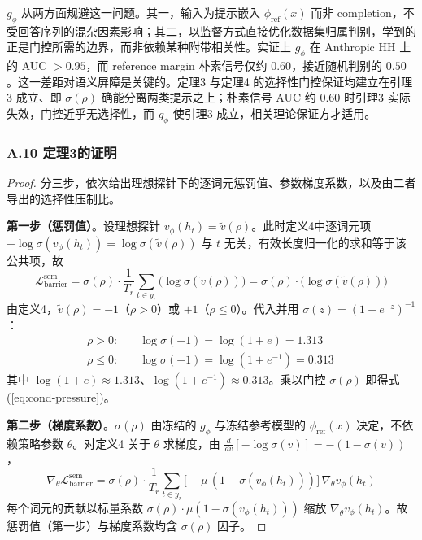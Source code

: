 \documentclass[lettersize,journal]{IEEEtran}
\begin{document}
$g_\phi$ 从两方面规避这一问题。其一，输入为提示嵌入 $\phi_{\text{ref}}(x)$ 而非 completion，不受回答序列的混杂因素影响；其二，以监督方式直接优化数据集归属判别，学到的正是门控所需的边界，而非依赖某种附带相关性。实证上 $g_\phi$ 在 Anthropic HH 上的 AUC $> 0.95$，而 reference margin 朴素信号仅约 $0.60$，接近随机判别的 $0.50$。这一差距对语义屏障是关键的。定理3 与定理4 的选择性门控保证均建立在引理3 成立、即 $\sigma(\rho)$ 确能分离两类提示之上；朴素信号 AUC 约 $0.60$ 时引理3 实际失效，门控近乎无选择性，而 $g_\phi$ 使引理3 成立，相关理论保证方才适用。

\subsubsection*{A.10 定理3的证明}\label{app:condpressure}
\begin{proof}
分三步，依次给出理想探针下的逐词元惩罚值、参数梯度系数，以及由二者导出的选择性压制比。

\textbf{第一步（惩罚值）}。设理想探针 $v_\phi(h_t) = \tilde{v}(\rho)$。此时定义4中逐词元项 $-\log\sigma(v_\phi(h_t)) = \log\sigma(\tilde{v}(\rho))$ 与 $t$ 无关，有效长度归一化的求和等于该公共项，故
\begin{equation}
\mathcal{L}^{\text{sem}}_{\text{barrier}}
= \sigma(\rho)\cdot\frac{1}{T_r}\sum_{t \in y_r}\bigl(\log\sigma(\tilde{v}(\rho))\bigr)
= \sigma(\rho)\cdot\bigl(\log\sigma(\tilde{v}(\rho))\bigr)
\end{equation}
由定义4，$\tilde{v}(\rho) = -1$（$\rho > 0$）或 $+1$（$\rho \leq 0$）。代入并用 $\sigma(z) = (1+e^{-z})^{-1}$：
\begin{align}
\rho > 0:\quad &\log\sigma(-1) = \log(1 + e) = 1.313\, \\
\rho \leq 0:\quad &\log\sigma(+1) = \log(1 + e^{-1}) = 0.313\,
\end{align}
其中 $\log(1+e) \approx 1.313$、$\log(1+e^{-1}) \approx 0.313$。乘以门控 $\sigma(\rho)$ 即得式(\ref{eq:cond-pressure})。

\textbf{第二步（梯度系数）}。$\sigma(\rho)$ 由冻结的 $g_\phi$ 与冻结参考模型的 $\phi_{\text{ref}}(x)$ 决定，不依赖策略参数 $\theta$。对定义4 关于 $\theta$ 求梯度，由 $\frac{d}{dv}[-\log\sigma(v)] = -(1-\sigma(v))$，
\begin{equation}
\nabla_\theta\mathcal{L}^{\text{sem}}_{\text{barrier}}
= \sigma(\rho)\cdot\frac{1}{T_r}\sum_{t \in y_r}
\bigl[-\mu\,(1-\sigma(v_\phi(h_t)))\bigr]\,\nabla_\theta v_\phi(h_t)
\end{equation}
每个词元的贡献以标量系数 $\sigma(\rho)\cdot\mu(1-\sigma(v_\phi(h_t)))$ 缩放 $\nabla_\theta v_\phi(h_t)$。故惩罚值（第一步）与梯度系数均含 $\sigma(\rho)$ 因子。


\end{proof}
\end{document}
